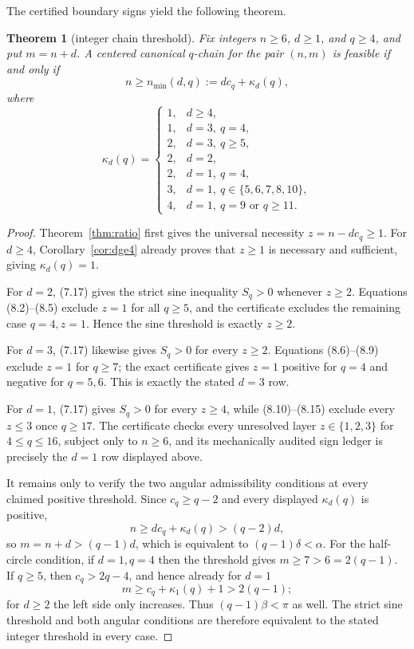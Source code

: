 \documentclass[11pt]{article}
\newtheorem{theorem}{Theorem}[section]
\theoremstyle{remark}
\begin{document}
The certified boundary signs yield the following theorem.

\begin{theorem}[integer chain threshold]\label{thm:integerthreshold}
Fix integers $n\ge6$, $d\ge1$, and $q\ge4$, and put $m=n+d$. A centered canonical $q$-chain for the pair $(n,m)$ is feasible if and only if
\[
 n\ge n_{\min}(d,q):=dc_q+\kappa_d(q),
\]
where
\[
\boxed{
\kappa_d(q)=
\begin{cases}
1,&d\ge4,\\
1,&d=3,\ q=4,\\
2,&d=3,\ q\ge5,\\
2,&d=2,\\
2,&d=1,\ q=4,\\
3,&d=1,\ q\in\{5,6,7,8,10\},\\
4,&d=1,\ q=9\text{ or }q\ge11.
\end{cases}}
\tag{8.16}
\]
\end{theorem}

\begin{proof}
Theorem~\ref{thm:ratio} first gives the universal necessity \(z=n-dc_q\ge1\).
For \(d\ge4\), Corollary~\ref{cor:dge4} already proves that \(z\ge1\) is necessary and sufficient, giving \(\kappa_d(q)=1\).

For \(d=2\), (7.17) gives the strict sine inequality \(S_q>0\) whenever \(z\ge2\).  Equations (8.2)--(8.5) exclude \(z=1\) for all \(q\ge5\), and the certificate excludes the remaining case \(q=4,z=1\).  Hence the sine threshold is exactly \(z\ge2\).

For \(d=3\), (7.17) likewise gives \(S_q>0\) for every \(z\ge2\).  Equations (8.6)--(8.9) exclude \(z=1\) for \(q\ge7\); the exact certificate gives \(z=1\) positive for \(q=4\) and negative for \(q=5,6\).  This is exactly the stated \(d=3\) row.

For \(d=1\), (7.17) gives \(S_q>0\) for every \(z\ge4\), while (8.10)--(8.15) exclude every \(z\le3\) once \(q\ge17\).  The certificate checks every unresolved layer \(z\in\{1,2,3\}\) for \(4\le q\le16\), subject only to \(n\ge6\), and its mechanically audited sign ledger is precisely the \(d=1\) row displayed above.

It remains only to verify the two angular admissibility conditions at every claimed positive threshold.  Since \(c_q\ge q-2\) and every displayed \(\kappa_d(q)\) is positive,
\[
n\ge dc_q+\kappa_d(q)>(q-2)d,
\]
so \(m=n+d>(q-1)d\), which is equivalent to \((q-1)\delta<\alpha\).  For the half-circle condition, if \(d=1,q=4\) then the threshold gives \(m\ge7>6=2(q-1)\).  If \(q\ge5\), then \(c_q>2q-4\), and hence already for \(d=1\)
\[
m\ge c_q+\kappa_1(q)+1>2(q-1);
\]
for \(d\ge2\) the left side only increases.  Thus \((q-1)\beta<\pi\) as well.  The strict sine threshold and both angular conditions are therefore equivalent to the stated integer threshold in every case.
\end{proof}
\end{document}
